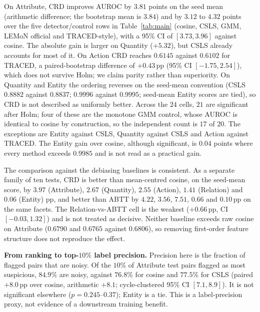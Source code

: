 On Attribute, CRD improves AUROC by $3.81$ points on the seed mean (arithmetic
difference; the bootstrap mean is $3.84$) and by $3.12$ to $4.32$ points over the
five detector/control rows in Table~\ref{tab:main} (cosine, CSLS, GMM, LEMoN official
and TRACED-style), with a 95\% CI of $[3.73,3.96]$ against cosine. The absolute gain is larger on Quantity ($+5.32$), but CSLS already
accounts for most of it. On Action CRD reaches $0.6145$ against $0.6102$ for TRACED,
a paired-bootstrap difference of $+0.43$\,pp (95\% CI $[-1.75,2.54]$), which does
not survive Holm; we claim parity rather than superiority. On Quantity and Entity the ordering reverses
on the seed-mean convention (CSLS $0.8882$ against $0.8837$; $0.9996$ against
$0.9995$; seed-mean Entity scores are tied), so CRD is not described as uniformly
better. Across the $24$ cells, $21$ are significant after Holm; four of these are the
monotone GMM control, whose AUROC is identical to cosine by construction, so the
independent count is $17$ of $20$. The exceptions are Entity against CSLS, Quantity
against CSLS and Action against TRACED. The Entity gain
over cosine, although significant, is $0.04$ points where every method exceeds
$0.9985$ and is not read as a practical gain.

The comparison against the debiasing baselines is consistent. As a separate family of
ten tests, CRD is better than mean-centred cosine, on the seed-mean score, by
$3.97$ (Attribute), $2.67$ (Quantity), $2.55$ (Action), $1.41$ (Relation) and $0.06$
(Entity) pp, and better than ABTT by $4.22$, $3.56$, $7.51$, $0.66$ and $0.10$\,pp
on the same facets. The Relation-vs-ABTT cell is the weakest ($+0.66$\,pp, CI
$[-0.03,1.32]$) and is not treated as decisive.
Neither baseline exceeds raw cosine on Attribute ($0.6790$ and $0.6765$ against
$0.6806$), so removing first-order feature structure does not reproduce the effect.

\textbf{From ranking to top-$10\%$ label precision.} Precision here is the fraction
of flagged pairs that are noisy. Of the $10\%$ of Attribute test pairs
flagged as most suspicious, $84.9\%$ are noisy, against $76.8\%$ for cosine and
$77.5\%$ for CSLS (paired $+8.0$\,pp over cosine, arithmetic $+8.1$;
cycle-clustered 95\% CI $[7.1,8.9]$). It is not significant elsewhere
($p=0.245$--$0.37$); Entity is a tie. This is a label-precision proxy, not evidence
of a downstream training benefit.

